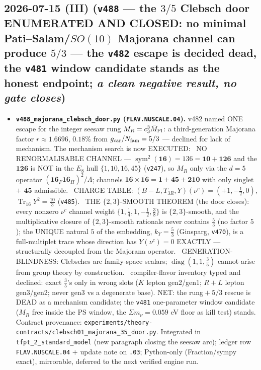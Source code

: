 \subsection*{2026-07-15 (III) (\texttt{v488} --- the $3/5$ Clebsch door ENUMERATED AND CLOSED: no minimal Pati--Salam/$SO(10)$ Majorana channel can produce $5/3$ --- the \texttt{v482} escape is decided dead, the \texttt{v481} window candidate stands as the honest endpoint; \emph{a clean negative result, no gate closes})}
\begin{itemize}[leftmargin=1.5em]
\item \textbf{\texttt{v488\_majorana\_clebsch\_door.py} (\texttt{FLAV.NUSCALE.04}).} v482 named ONE escape
for the integer seesaw rung $M_R=c_3^3\bar M_{\mathrm{Pl}}$: a third-generation Majorana factor $r\approx1.6696$, $0.18\%$
from $g_{\mathrm{car}}/N_{\mathrm{fam}}=5/3$ --- declined for lack of mechanism. The mechanism search is now EXECUTED: \mE\ NO
RENORMALISABLE CHANNEL --- $\operatorname{sym}^2(\mathbf{16})=136=\mathbf{10}+\mathbf{126}$ and the
$\overline{\mathbf{126}}$ is NOT in the $E_8$ hull $\{1,10,16,45\}$ (\texttt{v247}), so $M_R$ only via the
$d{=}5$ operator $(\mathbf{16}_F\overline{\mathbf{16}}_H)^2/\Lambda$; channels
$\mathbf{16}\times\overline{\mathbf{16}}=\mathbf{1}+\mathbf{45}+\mathbf{210}$ with only singlet $+$
$\mathbf{45}$ admissible. \mE\ CHARGE TABLE: $(B{-}L,T_{3R},Y)(\nu^c)=(+1,-\tfrac12,0)$,
$\operatorname{Tr}_{16}Y^2=\tfrac{10}3$ (\texttt{v485}). \mE\ THE $\{2,3\}$-SMOOTH THEOREM (the door closes):
every nonzero $\nu^c$ channel weight $\{1,\tfrac14,1,-\tfrac12,\tfrac38\}$ is $\{2,3\}$-smooth, and the
multiplicative closure of $\{2,3\}$-smooth rationals never contains $\tfrac53$ (no factor $5$); the UNIQUE
natural $5$ of the embedding, $k_Y=\tfrac53$ (Ginsparg, \texttt{v470}), is a full-multiplet trace whose
direction has $Y(\nu^c)=0$ EXACTLY --- structurally decoupled from the Majorana operator. \mE\
GENERATION-BLINDNESS: Clebsches are family-space scalars; $\operatorname{diag}(1,1,\tfrac35)$ cannot arise
from group theory by construction. \mO\ compiler-flavor inventory typed and declined: exact $\tfrac35$'s only
in wrong slots ($K$ lepton gen2/gen1; $R+L$ lepton gen3/gen2; never gen3 vs a degenerate base). NET: the
rung${}+{}5/3$ rescue is DEAD as a mechanism candidate; the \texttt{v481} one-parameter window candidate
($M_R$ free inside the PS window, the $\Sigma m_\nu=0.059$ eV floor as kill test) stands. Contract
provenance: \texttt{experiments/theory-contracts/clebsch01\_majorana\_35\_door.py}. Integrated in
\texttt{tfpt\_2\_standard\_model} (new paragraph closing the seesaw arc); ledger row
\texttt{FLAV.NUSCALE.04} $+$ update note on \texttt{.03}; Python-only (Fraction/sympy exact), mirrorable,
deferred to the next verified engine run.
\end{itemize}

